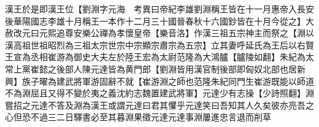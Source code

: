 漢王於是即漢王位【劉淵字元海　考異曰帝紀李雄劉淵稱王皆在十一月惠帝入長安後華陽國志李雄十月稱王一本作十二月三十國晉春秋十六國鈔皆在十月今從之】大赦改元曰元熙追尊安樂公禪為孝懷皇帝【樂音洛】作漢三祖五宗神主而祭之【淵以漢高祖世祖昭烈為三祖太宗世宗中宗顯宗肅宗為五宗】立其妻呼延氏為王后以右賢王宣為丞相崔游為御史大夫左於陸王宏為太尉范隆為大鴻臚【臚陵如翻】朱紀為太常上黨崔懿之後部人陳元達皆為黄門郎【劉淵皆用漢官制後部即匈奴北部也居新興】族子曜為建武將軍游固辭不就【崔游淵之師也范隆朱紀同門生崔游既能以師道不為淵屈且又得不變於夷之義沈約志魏置建武將軍】元達少有志操【少詩照翻】淵嘗招之元達不答及淵為漢王或謂元達曰君其懼乎元達笑曰吾知其人久矣彼亦亮吾之心但恐不過三二日驛書必至其暮淵果徵元達元達事淵屢進忠言退而削草